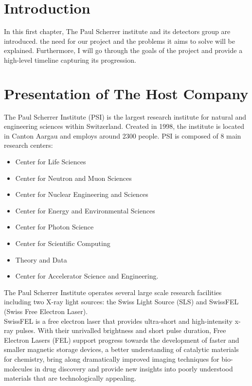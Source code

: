 \begin{spacing}{1.2}

    \section*{Introduction}
    In this first chapter, The Paul Scherrer institute and its detectors group are introduced.
    the need for our project and the problems it aims to solve will be explained. Furthermore,
    I will go through the goals of the project and provide a high-level timeline
    capturing its progression.

    \section{Presentation of The Host Company}
    The Paul Scherrer Institute (PSI) is the largest research institute for natural and engineering sciences within Switzerland.
    Created in 1998, the institute is located in Canton Aargau and employs around 2300 people.
    PSI is composed of 8 main research centers:
    \begin{itemize}
        \item Center for Life Sciences
        \item Center for Neutron and Muon Sciences
        \item Center for Nuclear Engineering and Sciences
        \item Center for Energy and Environmental Sciences
        \item Center for Photon Science
        \item Center for Scientific Computing
        \item Theory and Data
        \item Center for Accelerator Science and Engineering.
    \end{itemize}

    The Paul Scherrer Institute operates several large scale research facilities including two
    X-ray light sources: the Swiss Light Source (SLS) and SwissFEL (Swiss Free Electron Laser).\\


    SwissFEL is a free electron laser
    that provides ultra-short and high-intensity x-ray pulses. With their unrivalled brightness
    and short pulse duration, Free Electron Lasers (FEL) support progress
    towards the development of faster and smaller magnetic storage devices,
    a better understanding of catalytic materials for chemistry, bring along dramatically
    improved imaging techniques for bio-molecules in drug discovery and provide new
    insights into poorly understood materials that are technologically appealing. \cite{whySwissFEL}\\



\end{spacing}
